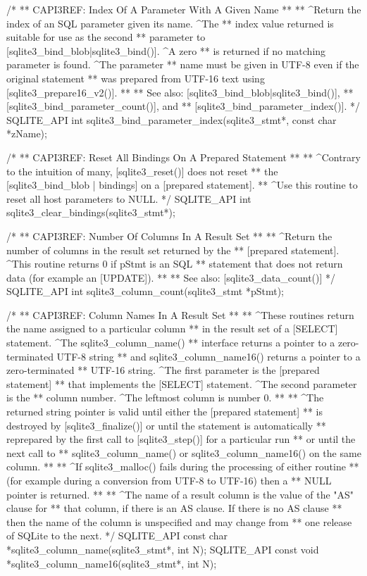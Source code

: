 \begin{Codex}[label=sqlite3.h,numbers=left]
{/*
** CAPI3REF: Index Of A Parameter With A Given Name
**
** ^Return the index of an SQL parameter given its name.  ^The
** index value returned is suitable for use as the second
** parameter to [sqlite3_bind_blob|sqlite3_bind()].  ^A zero
** is returned if no matching parameter is found.  ^The parameter
** name must be given in UTF-8 even if the original statement
** was prepared from UTF-16 text using [sqlite3_prepare16_v2()].
**
** See also: [sqlite3_bind_blob|sqlite3_bind()],
** [sqlite3_bind_parameter_count()], and
** [sqlite3_bind_parameter_index()].
*/
SQLITE_API int sqlite3_bind_parameter_index(sqlite3_stmt*, const char *zName);

/*
** CAPI3REF: Reset All Bindings On A Prepared Statement
**
** ^Contrary to the intuition of many, [sqlite3_reset()] does not reset
** the [sqlite3_bind_blob | bindings] on a [prepared statement].
** ^Use this routine to reset all host parameters to NULL.
*/
SQLITE_API int sqlite3_clear_bindings(sqlite3_stmt*);

/*
** CAPI3REF: Number Of Columns In A Result Set
**
** ^Return the number of columns in the result set returned by the
** [prepared statement]. ^This routine returns 0 if pStmt is an SQL
** statement that does not return data (for example an [UPDATE]).
**
** See also: [sqlite3_data_count()]
*/
SQLITE_API int sqlite3_column_count(sqlite3_stmt *pStmt);

/*
** CAPI3REF: Column Names In A Result Set
**
** ^These routines return the name assigned to a particular column
** in the result set of a [SELECT] statement.  ^The sqlite3_column_name()
** interface returns a pointer to a zero-terminated UTF-8 string
** and sqlite3_column_name16() returns a pointer to a zero-terminated
** UTF-16 string.  ^The first parameter is the [prepared statement]
** that implements the [SELECT] statement. ^The second parameter is the
** column number.  ^The leftmost column is number 0.
**
** ^The returned string pointer is valid until either the [prepared statement]
** is destroyed by [sqlite3_finalize()] or until the statement is automatically
** reprepared by the first call to [sqlite3_step()] for a particular run
** or until the next call to
** sqlite3_column_name() or sqlite3_column_name16() on the same column.
**
** ^If sqlite3_malloc() fails during the processing of either routine
** (for example during a conversion from UTF-8 to UTF-16) then a
** NULL pointer is returned.
**
** ^The name of a result column is the value of the "AS" clause for
** that column, if there is an AS clause.  If there is no AS clause
** then the name of the column is unspecified and may change from
** one release of SQLite to the next.
*/
SQLITE_API const char *sqlite3_column_name(sqlite3_stmt*, int N);
SQLITE_API const void *sqlite3_column_name16(sqlite3_stmt*, int N);

}
\end{Codex}
